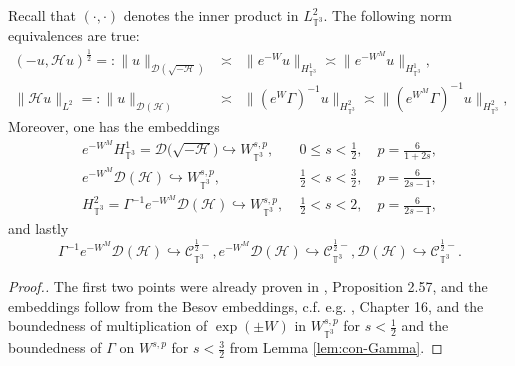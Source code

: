 \begin{lem}
  \label{lem:embed}Recall that $(\cdot, \cdot)$ denotes the inner product in
  $L_{\mathbb{T}^3}^2$. The following norm equivalences are true:
  \begin{eqnarray}
    (- u, \mathcal{H} u)^{\frac{1}{2}} =: \| u \|_{\mathcal{D} \left(
    \sqrt{- \mathcal{H}} \right)} & \asymp & \| e^{- W} u
    \|_{H_{\mathbb{T}^3}^1} \asymp \| e^{- W^M} u \|_{H_{\mathbb{T}^3}^1}, 
    \label{eq:Dom-equiv-H1}\\
    \| \mathcal{H} u \|_{L^2} =: \| u \|_{\mathcal{D} (\mathcal{H})}
    & \asymp & \| (e^W \Gamma)^{- 1} u \|_{H_{\mathbb{T}^3}^2} \asymp \|
    (e^{W^M} \Gamma)^{- 1} u \|_{H_{\mathbb{T}^3}^2},  \label{eq:Dom-equiv-H2}
  \end{eqnarray}
  Moreover, one has the embeddings
  \begin{eqnarray}
  e^{- W^M} H_{\mathbb{T}^3}^1 =\mathcal{D} \big( \sqrt{- \mathcal{H}}
    \big) \hookrightarrow W_{\mathbb{T}^3}^{s, p}, \quad & 0 \leqslant
    s < \frac{1}{2}, \quad p = \frac{6}{1 + 2 s},\\ \label{eq:emb-energydom-Wsp}
    e^{- W^M} \mathcal{D} (\mathcal{H}) \hookrightarrow W_{\mathbb{T}^3}^{s,
    p}, \quad & \frac{1}{2} < s < \frac{3}{2}, \quad p = \frac{6}{2 s -
    1},\\
    H_{\mathbb{T}^3}^2 = \Gamma^{- 1} e^{- W^M} \mathcal{D} (\mathcal{H})
    \hookrightarrow W_{\mathbb{T}^3}^{s, p}, & \frac{1}{2} < s <
    2, \quad p = \frac{6}{2 s - 1},  
  \end{eqnarray}
  and lastly 
  \begin{equation}
   \Gamma^{- 1} e^{- W^M} \mathcal{D} (\mathcal{H}) \hookrightarrow
    \mathcal{C}_{\mathbb{T}^3}^{\frac{1}{2} -}, e^{- W^M} \mathcal{D}
    (\mathcal{H}) \hookrightarrow \mathcal{C}_{\mathbb{T}^3}^{\frac{1}{2} -},
    \mathcal{D} (\mathcal{H}) \hookrightarrow
    \mathcal{C}_{\mathbb{T}^3}^{\frac{1}{2} -}. 
    \end{equation}
  \end{lem}

\begin{proof}[Proof.]
 The first two points were already proven in {\cite{GUZ20}}, Proposition
 2.57, and the embeddings follow from the Besov embeddings, c.f. e.g.
  {\cite{W22}}, Chapter 16, and the boundedness of multiplication of $\exp
  (\pm W)$ in $W_{\mathbb{T}^3}^{s, p}$ for $s < \frac{1}{2}$ and the boundedness
  of $\Gamma$ on $W^{s, p}$ for $s < \frac{3}{2}$ from Lemma \ref{lem:con-Gamma}.
\end{proof}

